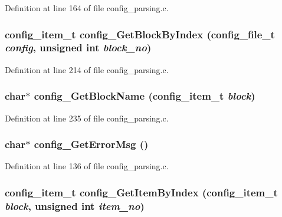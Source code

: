 Definition at line 164 of file config\_\-parsing.c.
\subsubsection[{config\_\-GetBlockByIndex}]{\setlength{\rightskip}{0pt plus 5cm}config\_\-item\_\-t config\_\-GetBlockByIndex (config\_\-file\_\-t {\em config}, \/  unsigned int {\em block\_\-no})}\label{config__parsing_8c_a87362059b4e1951b3f1054e7c5a6fc9f}


Definition at line 214 of file config\_\-parsing.c.
\subsubsection[{config\_\-GetBlockName}]{\setlength{\rightskip}{0pt plus 5cm}char$\ast$ config\_\-GetBlockName (config\_\-item\_\-t {\em block})}\label{config__parsing_8c_a075c7715682347ce04b089758e7aedab}


Definition at line 235 of file config\_\-parsing.c.
\subsubsection[{config\_\-GetErrorMsg}]{\setlength{\rightskip}{0pt plus 5cm}char$\ast$ config\_\-GetErrorMsg ()}\label{config__parsing_8c_aab9a6d7b5f77cb7b0da504e52ba61adf}


Definition at line 136 of file config\_\-parsing.c.
\subsubsection[{config\_\-GetItemByIndex}]{\setlength{\rightskip}{0pt plus 5cm}config\_\-item\_\-t config\_\-GetItemByIndex (config\_\-item\_\-t {\em block}, \/  unsigned int {\em item\_\-no})}\label{config__parsing_8c_aa6232f17aec5d583443924e79b536002}


